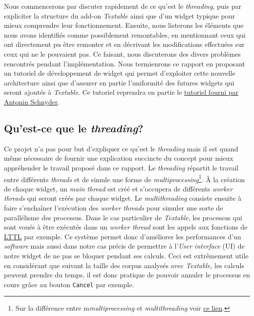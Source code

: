 \documentclass{article}
\begin{document}
Nous commencerons par discuter rapidement de ce qu'est le \textit{threading}, puis par expliciter la structure du add-on \textit{Textable} ainsi que d'un widget typique pour mieux comprendre leur fonctionnement. Ensuite, nous listerons les éléments que nous avons identifiés comme possiblement remontables, en mentionnant ceux qui ont directement pu être remonter et en décrivant les modifications effectuées sur ceux qui ne le pouvaient pas. Ce faisant, nous discuterons des divers problèmes rencontrés pendant l'implémentation. Nous termienrons ce rapport en proposant un tutoriel de développement de widget qui permet d'exploiter cette nouvelle architecture ainsi que d'assurer en partie l'uniformité des futures widgets qui seront ajoutés à \textit{Textable}. Ce tutoriel reprendra en partie le \href{https://docs.google.com/document/d/1QtXm2aYMZXAyM7mfBTqxt_XrTNFqC7e3aqy7OC1A_18/edit}{tutoriel fourni par Antonin Schnyder}.

\subsection{Qu'est-ce que le \textit{threading}?}

Ce projet n'a pas pour but d'expliquer ce qu'est le \textit{threading} mais il est quand même nécessaire de fournir une explication succincte du concept pour mieux appréhender le travail proposé dans ce rapport.
Le \textit{threading} répartit le travail entre différents \textit{threads} et de simule une forme de \textit{multiprocessing}\footnote{Sur la différence entre m\textit{multiprocessing} et \textit{multithreading} voir \href{https://www.geeksforgeeks.org/difference-between-multithreading-vs-multiprocessing-in-python/}{ce lien}.}. À la création de chaque widget, un \textit{main thread} est créé et s'occupera de différents \textit{worker threads} qui seront créés par chaque widget. Le \textit{multithreading} consiste ensuite à faire s'enchaîner l'exécution des \textit{worker threads} pour simuler une sorte de parallélisme des processus. Dans le cas particulier de \textit{Textable}, les processus qui sont voués à être exécutés dans un \textit{worker thread} sont les appels aux fonctions de \href{https://github.com/axanthos/LTTL}{LTTL} par exemple.
Ce système permet donc d'améliorer les performances d'un \textit{software} mais aussi dans notre cas précis de permettre à l'\textit{User interface} (UI) de notre widget de ne pas se bloquer pendant ses calculs. Ceci est extrêmement utile en considérant que suivant la taille des corpus analysés avec \textit{Textable}, les calculs peuvent prendre du temps, il est donc pratique de pouvoir annuler le processus en cours grâce au bouton \texttt{Cancel} par exemple.
\end{document}
